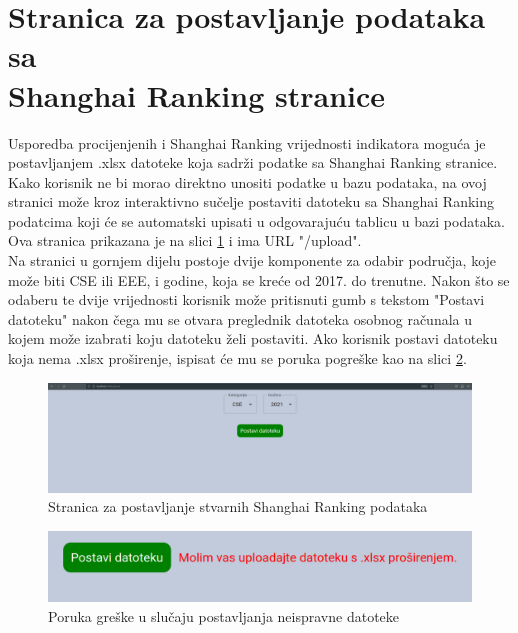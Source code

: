 \documentclass[times, utf8, zavrsni]{fer}
\begin{document}
\section{Stranica za postavljanje podataka sa \\Shanghai Ranking stranice}
Usporedba procijenjenih i Shanghai Ranking vrijednosti indikatora moguća je \\postavljanjem .xlsx datoteke koja sadrži 
podatke sa Shanghai Ranking stranice. Kako korisnik ne bi morao direktno unositi podatke u bazu podataka, na ovoj stranici može kroz 
interaktivno sučelje postaviti datoteku sa Shanghai Ranking podatcima koji će se automatski upisati u odgovarajuću tablicu u bazi podataka.
\\Ova stranica prikazana je na slici \ref{fig:upload} i ima URL "/upload".
\\Na stranici u gornjem dijelu postoje dvije komponente za odabir područja, koje može biti CSE ili EEE, i godine, koja se kreće od 2017. do trenutne. Nakon što 
se odaberu te dvije vrijednosti korisnik može pritisnuti gumb s tekstom "Postavi datoteku" nakon čega mu se otvara preglednik datoteka osobnog računala
u kojem može izabrati koju datoteku želi postaviti. Ako korisnik postavi datoteku koja nema .xlsx proširenje, ispisat će mu se poruka pogreške kao na 
slici \ref{fig:error}.
\begin{figure}[htb]
    \hspace*{-2cm}  
       \includegraphics[scale=0.2]{upload.png} 
       \caption{Stranica za postavljanje stvarnih Shanghai Ranking podataka}
       \label{fig:upload}
       \end{figure} 
 \begin{figure}[htb]
        \centering
           \includegraphics[scale=0.2]{error.png} 
           \caption{Poruka greške u slučaju postavljanja neispravne datoteke}
           \label{fig:error}
           \end{figure}        
\end{document}
